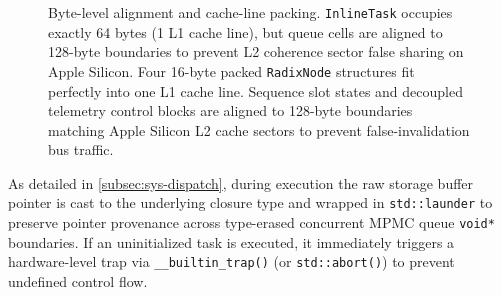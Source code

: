 \documentclass[conference,10pt]{IEEEtran}
\begin{document}
\begin{figure}[h]
{%
}
\caption{Byte-level alignment and cache-line packing. \texttt{InlineTask} occupies exactly 64 bytes (1 L1 cache line), but queue cells are aligned to 128-byte boundaries to prevent L2 coherence sector false sharing on Apple Silicon. Four 16-byte packed \texttt{RadixNode} structures fit perfectly into one L1 cache line. Sequence slot states and decoupled telemetry control blocks are aligned to 128-byte boundaries matching Apple Silicon L2 cache sectors to prevent false-invalidation bus traffic.}
\label{fig:memory_layouts}
\end{figure}

As detailed in \cref{subsec:sys-dispatch}, during execution the raw storage buffer pointer is cast to the underlying closure type and wrapped in \texttt{std::launder} to preserve pointer provenance across type-erased concurrent MPMC queue \texttt{void*} boundaries. If an uninitialized task is executed, it immediately triggers a hardware-level trap via \texttt{\_\_builtin\_trap()} (or \texttt{std::abort()}) to prevent undefined control flow.
\end{document}
